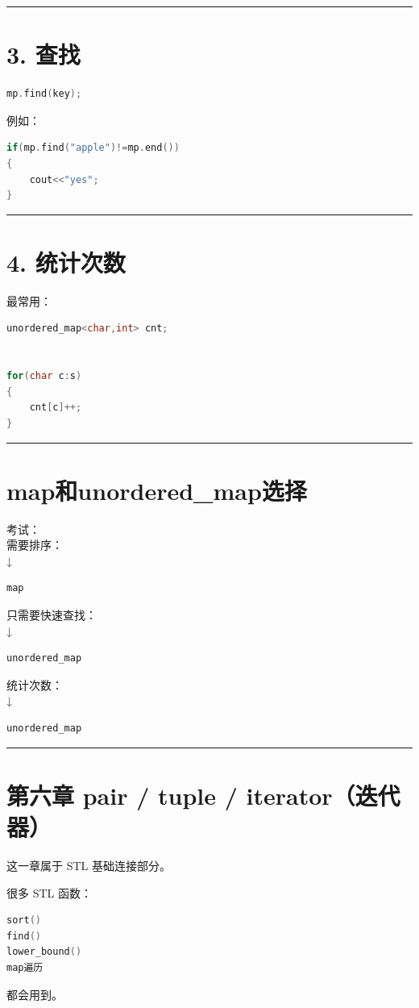 \documentclass[10pt,twocolumn]{extarticle}
\begin{document}
\noindent\rule{\linewidth}{0.4pt}

\section{3. 查找}
\begin{lstlisting}[language=C++]
mp.find(key);
\end{lstlisting}
例如：
\begin{lstlisting}[language=C++]
if(mp.find("apple")!=mp.end())
{
    cout<<"yes";
}
\end{lstlisting}

\noindent\rule{\linewidth}{0.4pt}

\section{4. 统计次数}
最常用：
\begin{lstlisting}[language=C++]
unordered_map<char,int> cnt;


for(char c:s)
{
    cnt[c]++;
}
\end{lstlisting}

\noindent\rule{\linewidth}{0.4pt}

\section{map和unordered\_map选择}

考试：\\
需要排序：\\
↓
\begin{lstlisting}[language=C++]
map
\end{lstlisting}
只需要快速查找：\\
↓
\begin{lstlisting}[language=C++]
unordered_map
\end{lstlisting}
统计次数：\\
↓
\begin{lstlisting}[language=C++]
unordered_map
\end{lstlisting}

\noindent\rule{\linewidth}{0.4pt}

\section{第六章 pair / tuple / iterator（迭代器）}

这一章属于 STL 基础连接部分。

很多 STL 函数：
\begin{lstlisting}[language=C++]
sort()
find()
lower_bound()
map遍历
\end{lstlisting}
都会用到。
\end{document}
